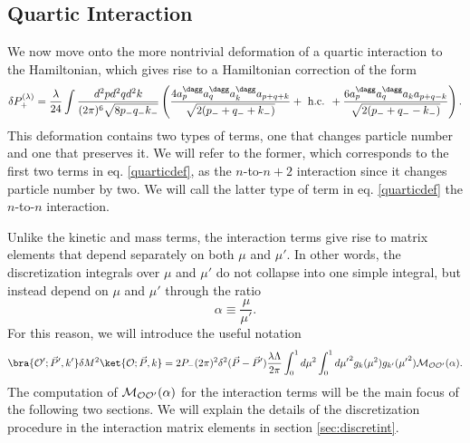 {\subsection{Quartic Interaction} We now move onto the more nontrivial deformation of a quartic interaction to the Hamiltonian, which gives rise to a Hamiltonian correction of the form \begin{equation}
	\begin{aligned}
		\delta P_+^{(\lambda)} = \frac{\lambda}{24} \int \frac{d^2p d^2 q d^2 k}{(2\pi)^6 \sqrt{8 p_- q_- k_-}} \left( \frac{4 a^\dagg_p a^\dagg_q a^\dagg_k a_{p+q+k}}{\sqrt{2(p_- + q_- + k_-)}} + \textrm{ h.c. } + \frac{6 a^\dagg_p a^\dagg_q a_k a_{p+q-k}}{\sqrt{2(p_- + q_- - k_-)}} \right). \label{quarticdef}
	\end{aligned}
\end{equation} This deformation contains two types of terms, one that changes particle number and one that preserves it. We will refer to the former, which corresponds to the first two terms in eq. \eqref{quarticdef}, as the $n$-to-$n+2$ interaction since it changes particle number by two. We will call the latter type of term in eq. \eqref{quarticdef} the $n$-to-$n$ interaction.

Unlike the kinetic and mass terms, the interaction terms give rise to matrix elements that depend separately on both $\mu$ and $\mu'$. In other words, the discretization integrals over $\mu$ and $\mu'$ do not collapse into one simple integral, but instead depend on $\mu$ and $\mu'$ through the ratio \begin{equation}
	\boxed{\alpha \equiv \frac{\mu}{\mu'} .}
\end{equation} For this reason, we will introduce the useful notation \begin{equation}
	\begin{aligned}
		\bra{\Ocal'; \vec{P}', k'} \delta M^2 \ket{\Ocal; \vec{P}, k} = 2P_- (2\pi)^2 \delta^2(\vec{P}- \vec{P}') \frac{\lambda \Lambda}{2\pi} \int_0^1 d\mu^2  \int_0^1d{\mu'}^2  g_k(\mu^2) g_{k'}({\mu'}^2) \Mcal_{\Ocal \Ocal'}(\alpha).
	\end{aligned}
\end{equation} The computation of ${\cal M}_{{\cal O} {\cal O}'}(\alpha)$ for the interaction terms will be the main focus of the following two sections. We will explain the details of the discretization procedure in the interaction matrix elements in section \ref{sec:discretint}.

}
